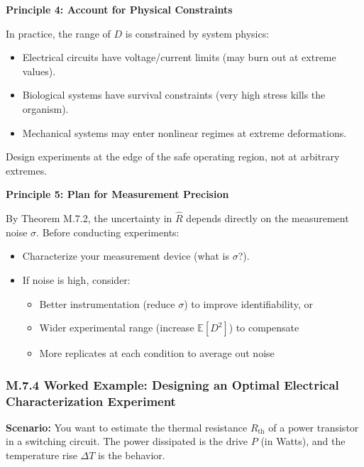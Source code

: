 \documentclass[
]{article}
\providecommand{\tightlist}{%
  \setlength{\itemsep}{0pt}\setlength{\parskip}{0pt}}
\begin{document}
\textbf{Principle 4: Account for Physical Constraints}

In practice, the range of \(D\) is constrained by system physics:

\begin{itemize}
\tightlist
\item
  Electrical circuits have voltage/current limits (may burn out at
  extreme values).
\item
  Biological systems have survival constraints (very high stress kills
  the organism).
\item
  Mechanical systems may enter nonlinear regimes at extreme
  deformations.
\end{itemize}

Design experiments at the edge of the safe operating region, not at
arbitrary extremes.

\textbf{Principle 5: Plan for Measurement Precision}

By Theorem M.7.2, the uncertainty in \(\widehat{R}\) depends directly on
the measurement noise \(\sigma\). Before conducting experiments:

\begin{itemize}
\tightlist
\item
  Characterize your measurement device (what is \(\sigma\)?).
\item
  If noise is high, consider:

  \begin{itemize}
  \tightlist
  \item
    Better instrumentation (reduce \(\sigma\)) to improve
    identifiability, or
  \item
    Wider experimental range (increase \(\mathbb{E}[D^2]\)) to
    compensate
  \item
    More replicates at each condition to average out noise
  \end{itemize}
\end{itemize}

\subsubsection{M.7.4 Worked Example: Designing an Optimal Electrical
Characterization
Experiment}\label{m.7.4-worked-example-designing-an-optimal-electrical-characterization-experiment}

\textbf{Scenario:} You want to estimate the thermal resistance
\(R_{\text{th}}\) of a power transistor in a switching circuit. The
power dissipated is the drive \(P\) (in Watts), and the temperature rise
\(\Delta T\) is the behavior.
\end{document}
